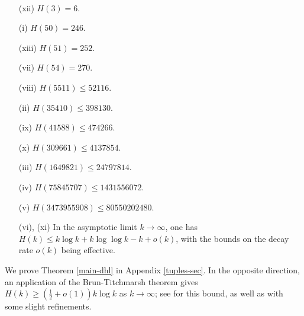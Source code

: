 \begin{theorem}[Bounds on $H(k)$]\label{hk-bound}\
\begin{itemize}
\item[(xii)] $H(3)=6$.
\item[(i)] $H(50) = 246$.
\item[(xiii)] $H(51) = 252$.
\item[(vii)] $H(54) = 270$.
\item[(viii)] $H(\num{5511}) \leq \num{52116}$.
\item[(ii)] $H(\num{35410}) \leq \num{398130}$.
\item[(ix)] $H(\num{41588}) \leq \num{474266}$.
\item[(x)] $H(\num{309661}) \leq \num{4137854}$.
\item[(iii)] $H(\num{1649821}) \leq \num{24797814}$.
\item[(iv)] $H(\num{75845707}) \leq \num{1431556072}$.
\item[(v)] $H(\num{3473955908}) \leq \num{80550202480}$.
\item[(vi), (xi)] In the asymptotic limit $k \to \infty$, one has $H(k) \leq k \log k + k \log\log k - k + o(k)$, with the bounds on the decay rate $o(k)$ being effective.
\end{itemize}
\end{theorem}

We prove Theorem \ref{main-dhl} in Appendix \ref{tuples-sec}.  In the opposite direction, an application of the Brun-Titchmarsh theorem gives $H(k) \geq (\frac{1}{2} + o(1)) k \log k$ as $k \to \infty$; see \cite[\S 3.9]{polymath8a-unabridged} for this bound, as well as with some slight refinements.

